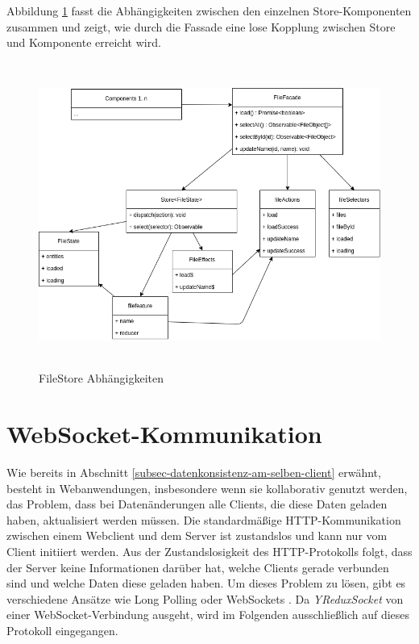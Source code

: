 \documentclass[12pt]{book}          %
\begin{document}
Abbildung \ref{fielStore-dependencies} fasst die Abhängigkeiten zwischen den einzelnen Store-Komponenten zusammen und zeigt, wie durch die Fassade eine lose Kopplung zwischen Store und Komponente erreicht wird.

\begin{figure}[htbp]
\centering
\includegraphics[height=10cm]{abbildungen/easy-state-comp.png}
\caption{FileStore Abhängigkeiten}
\label{fielStore-dependencies}
\end{figure}

\section{WebSocket-Kommunikation}
\label{sec-web-socket-kommunikation}

Wie bereits in Abschnitt \ref{subsec-datenkonsistenz-am-selben-client} erwähnt, besteht in Webanwendungen, insbesondere wenn sie kollaborativ genutzt werden, das Problem, dass bei Datenänderungen alle Clients, die diese Daten geladen haben, aktualisiert werden müssen. Die standardmäßige HTTP-Kommunikation zwischen einem Webclient und dem Server ist zustandslos und kann nur vom Client initiiert werden. Aus der Zustandslosigkeit des HTTP-Protokolls folgt, dass der Server keine Informationen darüber hat, welche Clients gerade verbunden sind und welche Daten diese geladen haben. Um dieses Problem zu lösen, gibt es verschiedene Ansätze wie Long Polling oder WebSockets \cite[182]{ackermann_webentwicklung_2021}. Da \textit{YReduxSocket} von einer WebSocket-Verbindung ausgeht, wird im Folgenden ausschließlich auf dieses Protokoll eingegangen.
\end{document}
